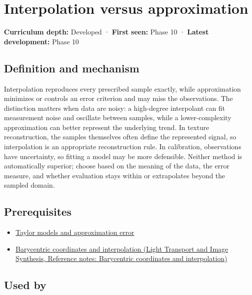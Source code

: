 \hypertarget{appendix-0c2a5f69851e}{}\label{referencestart:appendix-0c2a5f69851e}
\section{Interpolation versus approximation}\label{appendix-0c2a5f69851e-interpolation-versus-approximation}

\textbf{Curriculum depth:} Developed · \textbf{First seen:} Phase 10 · \textbf{Latest development:} Phase 10

\subsection{Definition and mechanism}\label{appendix-0c2a5f69851e-definition-and-mechanism}

Interpolation reproduces every prescribed sample exactly, while approximation minimizes or controls an error criterion and may miss the observations. The distinction matters when data are noisy: a high-degree interpolant can fit measurement noise and oscillate between samples, while a lower-complexity approximation can better represent the underlying trend. In texture reconstruction, the samples themselves often define the represented signal, so interpolation is an appropriate reconstruction rule. In calibration, observations have uncertainty, so fitting a model may be more defensible. Neither method is automatically superior; choose based on the meaning of the data, the error measure, and whether evaluation stays within or extrapolates beyond the sampled domain.

\subsection{Prerequisites}\label{appendix-0c2a5f69851e-prerequisites}

\begin{itemize}
\tightlist
\item
  \hyperref[appendix-32f39e9a3738]{Taylor models and approximation error}
\item
  \href{../04-Light-Transport-and-Image-Synthesis/main.pdf\#nameddest=appendix-02b9d9a81dca}{Barycentric coordinates and interpolation (Light Transport and Image Synthesis, Reference notes: Barycentric coordinates and interpolation)}
\end{itemize}

\subsection{Used by}\label{appendix-0c2a5f69851e-used-by}

